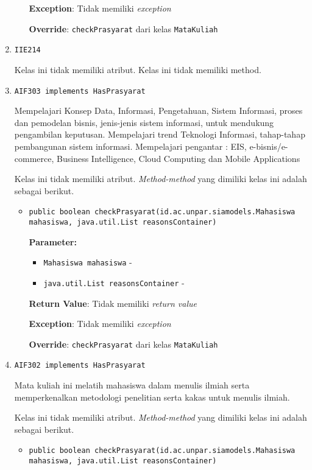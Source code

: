 \documentclass{article}
\begin{document}
\begin{enumerate}
\begin{itemize}
\textbf{Exception}: Tidak memiliki \textit{exception}

\textbf{Override}: \texttt{checkPrasyarat} dari kelas \texttt{MataKuliah}

\end{itemize}
\item \texttt{IIE214}



Kelas ini tidak memiliki atribut. Kelas ini tidak memiliki method. \item \texttt{AIF303 implements HasPrasyarat}

Mempelajari Konsep Data, Informasi, Pengetahuan, Sistem Informasi, proses dan
 pemodelan bisnis, jenis-jenis sistem informasi, untuk mendukung pengambilan
 keputusan. Mempelajari trend Teknologi Informasi, tahap-tahap pembangunan
 sistem informasi. Mempelajari pengantar : EIS, e-bisnis/e-commerce, Business
 Intelligence, Cloud Computing dan Mobile Applications

Kelas ini tidak memiliki atribut. \textit{Method-method} yang dimiliki kelas ini adalah sebagai berikut.
\begin{itemize}
\item \texttt{public boolean checkPrasyarat(id.ac.unpar.siamodels.Mahasiswa mahasiswa, java.util.List reasonsContainer)}

\textbf{Parameter:}
\begin{itemize}
\item \texttt{Mahasiswa mahasiswa} - 
\item \texttt{java.util.List reasonsContainer} - 
\end{itemize}
\textbf{Return Value}: Tidak memiliki \textit{return value}

\textbf{Exception}: Tidak memiliki \textit{exception}

\textbf{Override}: \texttt{checkPrasyarat} dari kelas \texttt{MataKuliah}

\end{itemize}
\item \texttt{AIF302 implements HasPrasyarat}

Mata kuliah ini melatih mahasiswa dalam menulis ilmiah serta memperkenalkan
 metodologi penelitian serta kakas untuk menulis ilmiah.

Kelas ini tidak memiliki atribut. \textit{Method-method} yang dimiliki kelas ini adalah sebagai berikut.
\begin{itemize}
\item \texttt{public boolean checkPrasyarat(id.ac.unpar.siamodels.Mahasiswa mahasiswa, java.util.List reasonsContainer)}


\end{itemize}
\end{enumerate}
\end{document}

